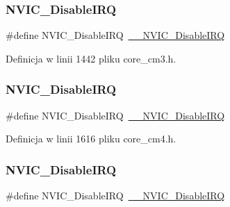 \subsubsection{\texorpdfstring{N\+V\+I\+C\+\_\+\+Disable\+I\+RQ}{NVIC\_DisableIRQ}\hspace{0.1cm}{\footnotesize\ttfamily [8/12]}}
{\footnotesize\ttfamily \#define N\+V\+I\+C\+\_\+\+Disable\+I\+RQ~\hyperlink{group___c_m_s_i_s___core___n_v_i_c_functions_gae016e4c1986312044ee768806537d52f}{\+\_\+\+\_\+\+N\+V\+I\+C\+\_\+\+Disable\+I\+RQ}}



Definicja w linii 1442 pliku core\+\_\+cm3.\+h.

\mbox{\label{group___c_m_s_i_s___core___n_v_i_c_functions_ga73b4e251f59cab4e9a5e234aac02ae57}} 
\subsubsection{\texorpdfstring{N\+V\+I\+C\+\_\+\+Disable\+I\+RQ}{NVIC\_DisableIRQ}\hspace{0.1cm}{\footnotesize\ttfamily [9/12]}}
{\footnotesize\ttfamily \#define N\+V\+I\+C\+\_\+\+Disable\+I\+RQ~\hyperlink{group___c_m_s_i_s___core___n_v_i_c_functions_gae016e4c1986312044ee768806537d52f}{\+\_\+\+\_\+\+N\+V\+I\+C\+\_\+\+Disable\+I\+RQ}}



Definicja w linii 1616 pliku core\+\_\+cm4.\+h.

\mbox{\label{group___c_m_s_i_s___core___n_v_i_c_functions_ga73b4e251f59cab4e9a5e234aac02ae57}} 
\subsubsection{\texorpdfstring{N\+V\+I\+C\+\_\+\+Disable\+I\+RQ}{NVIC\_DisableIRQ}\hspace{0.1cm}{\footnotesize\ttfamily [10/12]}}
{\footnotesize\ttfamily \#define N\+V\+I\+C\+\_\+\+Disable\+I\+RQ~\hyperlink{group___c_m_s_i_s___core___n_v_i_c_functions_gae016e4c1986312044ee768806537d52f}{\+\_\+\+\_\+\+N\+V\+I\+C\+\_\+\+Disable\+I\+RQ}}




